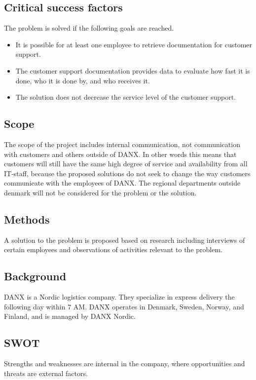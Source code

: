 \subsection{Critical success factors}
The problem is solved if the following goals are reached.
\begin{itemize}
	\item It is possible for at least one employee to retrieve documentation for customer support.
	\item The customer support documentation provides data to evaluate how fast it is done, who it is done by, and who receives it.
	\item The solution does not decrease the service level of the customer support.
\end{itemize}

\subsection{Scope}
The scope of the project includes internal communication, not communication with customers and others outside of DANX. In other words this means that customers will still have the same high degree of service and availability from all IT-staff, because the proposed solutions do not seek to change the way customers communicate with the employees of DANX. The regional departments outside denmark will not be considered for the problem or the solution.

\subsection{Methods}
A solution to the problem is proposed based on research including interviews of certain employees and observations of activities relevant to the problem.

\subsection{Background}
DANX is a Nordic logistics company. They specialize in express delivery the following day within 7 AM. DANX operates in Denmark, Sweden, Norway, and Finland, and is managed by DANX Nordic.

\subsection{SWOT}
Strengths and weaknesses are internal in the company, where opportunities and threats are external factors.

